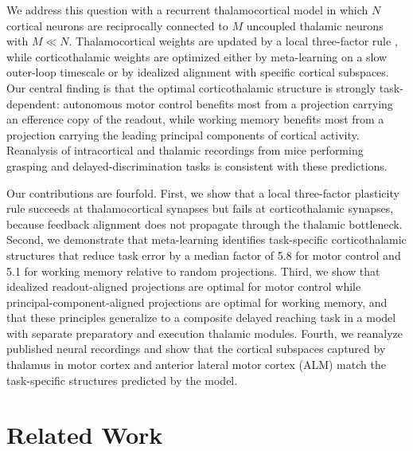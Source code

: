 \documentclass[11pt]{article}
\begin{document}
We address this question with a recurrent thalamocortical model in
which $N$ cortical neurons are reciprocally connected to $M$ uncoupled
thalamic neurons with $M \ll N$. Thalamocortical weights are updated by
a local three-factor rule \cite{murray2019local, lillicrap2016random},
while corticothalamic weights are optimized either by meta-learning on
a slow outer-loop timescale \cite{wang2018prefrontal,
hospedales2022meta} or by idealized alignment with specific cortical
subspaces. Our central finding is that the optimal corticothalamic
structure is strongly task-dependent: autonomous motor control benefits
most from a projection carrying an efference copy of the readout, while
working memory benefits most from a projection carrying the leading
principal components of cortical activity. Reanalysis of intracortical
and thalamic recordings from mice performing grasping and
delayed-discrimination tasks \cite{sauerbrei2020cortical,
guo2017maintenance} is consistent with these predictions.

Our contributions are fourfold. First, we show that a local three-factor
plasticity rule succeeds at thalamocortical synapses but fails at
corticothalamic synapses, because feedback alignment does not propagate
through the thalamic bottleneck. Second, we demonstrate that
meta-learning identifies task-specific corticothalamic structures that
reduce task error by a median factor of 5.8 for motor control and 5.1
for working memory relative to random projections. Third, we show that
idealized readout-aligned projections are optimal for motor control
while principal-component-aligned projections are optimal for working
memory, and that these principles generalize to a composite delayed
reaching task in a model with separate preparatory and execution
thalamic modules. Fourth, we reanalyze published neural recordings and
show that the cortical subspaces captured by thalamus in motor cortex
and anterior lateral motor cortex (ALM) match the task-specific
structures predicted by the model.

\section{Related Work}
\end{document}
